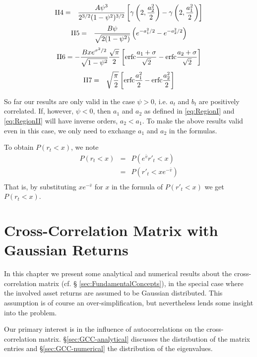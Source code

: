 \documentclass{book}
\begin{document}
\begin{eqnarray*}
  \text{II4} &=& {A\psi^3 \over 2^{3/2}(1 - \psi^2)^{3/2}} \left[
    \gamma\left(2, {a_2^2 \over 2}\right) -
    \gamma\left(2, {a_1^2 \over 2}\right)
  \right]
\end{eqnarray*}
\begin{eqnarray*}
  \text{II5} &=& {B\psi \over \sqrt{2(1 - \psi^2)}} \left(
    e^{-a_1^2/2} - e^{-a_2^2/2}
  \right)
\end{eqnarray*}
\begin{eqnarray*}
  \text{II6} = -{Bx e^{\sigma^2/2}\over \sqrt{1 - \psi^2}}{\sqrt \pi
    \over 2} \left[
    \text{erfc}{a_1 + \sigma \over \sqrt{2}} -
    \text{erfc}{a_2 + \sigma \over \sqrt{2}}
  \right]
\end{eqnarray*}
\begin{eqnarray*}
  \text{II7} &=& \sqrt{\pi \over 2} \left[
    \text{erfc}{a_1^2 \over 2} - \text{erfc}{a_2^2 \over 2}
  \right]
\end{eqnarray*}

So far our results are only valid in the case $\psi > 0$, i.e. $a_t$
and $b_t$ are positively correlated. If, however, $\psi < 0$, then
$a_1$ and $a_2$ as defined in \ref{eq:RegionI} and \ref{eq:RegionII}
will have inverse orders, $a_2 < a_1$. To make the above results valid
even in this case, we only need to exchange $a_1$ and $a_2$ in the
formulas.

To obtain $P(r_t < x)$, we note
\begin{eqnarray*}
P(r_t < x) &=& P(e^{\bar{v}} r'_t < x) \\
&=& P(r'_t < xe^{-\bar{v}}) \\
\end{eqnarray*}
That is, by substituting $xe^{-\bar{v}}$ for $x$ in the formula of
$P(r'_t < x)$ we get $P(r_t < x)$.

\chapter{Cross-Correlation Matrix with Gaussian Returns}
In this chapter we present some analytical and numerical results about
the cross-correlation matrix (cf. \S
\ref{sec:FundamentalConcepts}), in the special case where the involved
asset returns are assumed to be Gaussian distributed. This assumption
is of course an over-simplification, but nevertheless lends some
insight into the problem.

Our primary interest is in the influence of autocorrelations on the
cross-correlation matrix. \S \ref{sec:GCC-analytical} discusses the
distribution of the matrix entries and \S \ref{sec:GCC-numerical} the
distribution of the eigenvalues.
\end{document}
